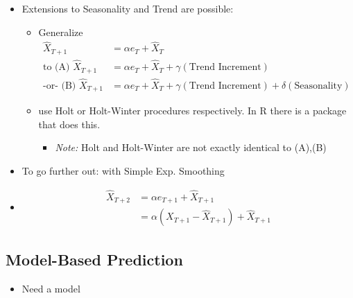 \begin{itemize}
\begin{itemize}
    \end{itemize}
    \item Extensions to Seasonality and Trend are possible:
    \begin{itemize}
        \item Generalize 
        \begin{align*}
            \hat{X}_{T+1} &= \alpha e_T+\hat{X}_T\\
            \text{to (A) } \hat{X}_{T+1}&= \alpha e_T+\hat{X}_T+\gamma(\text{Trend Increment}) \\
            \text{-or- (B) } \hat{X}_{T+1}&= \alpha e_T+\hat{X}_T+\gamma(\text{Trend Increment}) + \delta(\text{Seasonality})
        \end{align*}
        \item use Holt or Holt-Winter procedures respectively. In R there is a package that does this.
        \begin{itemize}
            \item[] \textit{Note:} Holt and Holt-Winter are not exactly identical to (A),(B)
        \end{itemize}
    \end{itemize}
    \item To go further out: \quad with Simple Exp. Smoothing\\

    \item {} 
    \begin{align*}
        \hat{X}_{T+2} &= \alpha e_{T+1} + \hat{X}_{T+1}\\
        &= \alpha(X_{T+1}-\hat{X}_{T+1})+\hat{X}_{T+1}
    \end{align*}
\end{itemize}

\subsection{Model-Based Prediction}

\begin{itemize}
    \item Need a model
\end{itemize}

